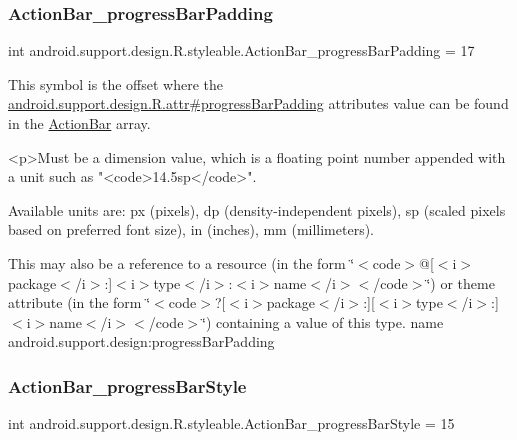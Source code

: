 \subsubsection{\texorpdfstring{Action\+Bar\+\_\+progress\+Bar\+Padding}{ActionBar\_progressBarPadding}}
{\footnotesize\ttfamily int android.\+support.\+design.\+R.\+styleable.\+Action\+Bar\+\_\+progress\+Bar\+Padding = 17\hspace{0.3cm}{\ttfamily [static]}}

This symbol is the offset where the \hyperlink{classandroid_1_1support_1_1design_1_1R_1_1attr_a0ae78413275468b2c80b4a5ec679467c}{android.\+support.\+design.\+R.\+attr\#progress\+Bar\+Padding} attribute\textquotesingle{}s value can be found in the \hyperlink{classandroid_1_1support_1_1design_1_1R_1_1styleable_ab795220a96557d11f8c21359b95bed82}{Action\+Bar} array.

\begin{DoxyVerb}      <p>Must be a dimension value, which is a floating point number appended with a unit such as "<code>14.5sp</code>".
\end{DoxyVerb}
 Available units are\+: px (pixels), dp (density-\/independent pixels), sp (scaled pixels based on preferred font size), in (inches), mm (millimeters). 

This may also be a reference to a resource (in the form \char`\"{}$<$code$>$@\mbox{[}$<$i$>$package$<$/i$>$\+:\mbox{]}$<$i$>$type$<$/i$>$\+:$<$i$>$name$<$/i$>$$<$/code$>$\char`\"{}) or theme attribute (in the form \char`\"{}$<$code$>$?\mbox{[}$<$i$>$package$<$/i$>$\+:\mbox{]}\mbox{[}$<$i$>$type$<$/i$>$\+:\mbox{]}$<$i$>$name$<$/i$>$$<$/code$>$\char`\"{}) containing a value of this type.  name android.\+support.\+design\+:progress\+Bar\+Padding \mbox{\label{classandroid_1_1support_1_1design_1_1R_1_1styleable_a3e9e3b6cbfbc94e8c2cf7b0dc31e1a87}} 
\subsubsection{\texorpdfstring{Action\+Bar\+\_\+progress\+Bar\+Style}{ActionBar\_progressBarStyle}}
{\footnotesize\ttfamily int android.\+support.\+design.\+R.\+styleable.\+Action\+Bar\+\_\+progress\+Bar\+Style = 15\hspace{0.3cm}{\ttfamily [static]}}

